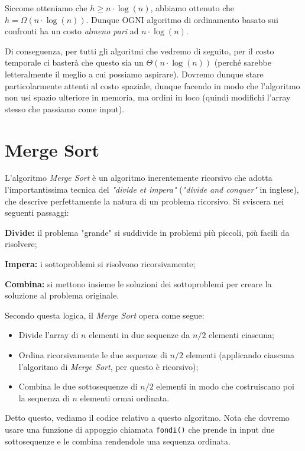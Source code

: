 \documentclass[12pt]{report}
\begin{document}
    Siccome otteniamo che $h \geq n\cdot \log(n)$, abbiamo ottenuto che $h = \Omega(n\cdot \log(n))$.
    Dunque OGNI algoritmo di ordinamento basato sui confronti ha un costo \textit{almeno pari }ad $n\cdot \log(n)$.
    
    Di conseguenza, per tutti gli algoritmi che vedremo di seguito, per il costo temporale ci basterà che questo sia un $\Theta(n\cdot \log(n))$ (perché sarebbe letteralmente il meglio a cui possiamo aspirare). Dovremo dunque stare particolarmente attenti al costo spaziale, dunque facendo in modo che l’algoritmo non usi spazio ulteriore in memoria, ma ordini in loco (quindi modifichi l’array stesso che passiamo come input).
    
    \newpage
    \section{Merge Sort}
    L'algoritmo \textit{Merge Sort} è un algoritmo inerentemente ricorsivo che adotta l'importantissima tecnica del \textit{"divide et impera"} (\textit{"divide and conquer"} in inglese), che descrive perfettamente la natura di un problema ricorsivo. Si sviscera nei seguenti passaggi:
    
    \begin{description}
    	\item \textbf{Divide:} il problema "grande" si suddivide in problemi più piccoli, più facili da risolvere;
    	\item \textbf{Impera:} i sottoproblemi si risolvono ricorsivamente;
    	\item \textbf{Combina:} si mettono insieme le soluzioni dei sottoproblemi per creare la soluzione al problema originale.
    \end{description}
    
    Secondo questa logica, il \textit{Merge Sort} opera come segue:
    \begin{itemize}
    	\item Divide l'array di $n$ elementi in due sequenze da $n/2$ elementi ciascuna;
    	\item Ordina ricorsivamente le due sequenze di $n/2$ elementi (applicando ciascuna l'algoritmo di \textit{Merge Sort}, per questo è ricorsivo);
    	\item Combina le due sottosequenze di $n/2$ elementi in modo che costruiscano poi la sequenza di $n$ elementi ormai ordinata.
    \end{itemize}
    		
    Detto questo, vediamo il codice relativo a questo algoritmo. Nota che dovremo usare una funzione di appoggio chiamata \texttt{fondi()} che prende in input due sottosequenze e le combina rendendole una sequenza ordinata.
    
\end{document}
